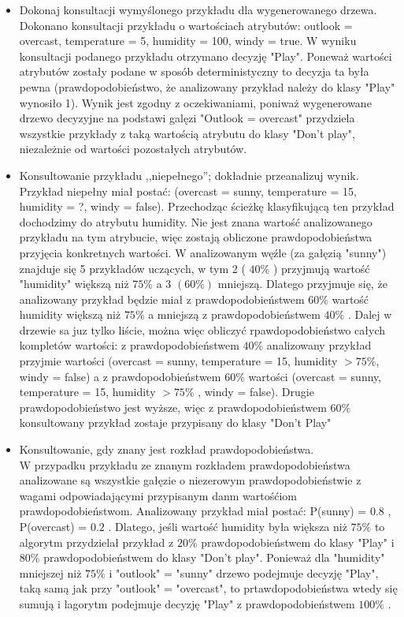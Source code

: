 \begin{itemize}
\item Dokonaj konsultacji wymyślonego przykładu dla wygenerowanego drzewa.
	\\Dokonano konsultacji przykładu o wartościach atrybutów: outlook = overcast, temperature = 5, humidity = 100, windy = true. W wyniku konsultacji podanego przykładu otrzymano decyzję "Play". Poneważ wartości atrybutów zostały podane w sposób deterministyczny to decyzja ta była pewna (prawdopodobieństwo, że analizowany przykład należy do klasy "Play" wynosiło 1). Wynik jest zgodny z oczekiwaniami, poniważ wygenerowane drzewo decyzyjne na podstawi galęzi "Outlook = overcast" przydziela wszystkie przykłady z taką wartością atrybutu do klasy "Don't play", niezależnie od wartości pozostałych atrybutów.
	
\item Konsultowanie przykładu ,,niepełnego''; dokładnie przeanalizuj wynik.
	\\Przykład niepełny miał postać: (overcast = sunny, temperature = 15, humidity = ?, windy = false). Przechodząc ścieżkę klasyfikującą ten przykład dochodzimy do atrybutu humidity. Nie jest znana wartość analizowanego przykładu na tym atrybucie, więc zostają obliczone prawdopodobieństwa przyjęcia konkretnych wartości. W analizowanym węźle (za gałęzią "sunny") znajduje się 5 przykładów uczących, w tym 2 ( $ 40\% $ ) przyjmują wartość "humidity" większą niż $ 75\% $ a 3  $ ( 60\% ) $ mniejszą. Dlatego przyjmuje się, że analizowany przykład będzie miał z prawdopodobieństwem $ 60\% $ wartość humidity większą niż $ 75\% $ a mniejszą z prawdopodobieństwem $ 40\% $ .	Dalej w drzewie sa juz tylko liście, można więc obliczyć rpawdopodobieństwo całych kompletów wartości: z prawdopodobieństwem $ 40\% $ analizowany przykład przyjmie wartości (overcast = sunny, temperature = 15, humidity  $ > 75\% $, windy = false) a z prawdopodobieństwem $ 60\% $ wartości  (overcast = sunny, temperature = 15, humidity $ >  75\% $ , windy = false). Drugie prawdopodobieństwo jest wyższe, więc z prawdopodobieństwem $ 60\% $ konsultowany przykład zostaje przypisany do klasy "Don't Play"
	
\item Konsultowanie, gdy znany jest rozkład prawdopodobieństwa.
	\\W przypadku przykładu ze znanym rozkładem prawdopodobieństwa analizowane są wszystkie gałęzie o niezerowym prawdopodobieństwie z wagami odpowiadającymi przypisanym danm wartośćiom prawdopodobieństwom. Analizowany przykład miał postać: P(sunny) = $ 0.8 $ , P(overcast) = $ 0.2 $ . Dlatego, jeśli wartość humidity była większa niż $ 75\% $ to algorytm przydzielał przykład z $ 20\% $ prawdopodobieństwem do klasy "Play" i $ 80 \% $ prawdopodobieństwem do klasy "Don't play". Ponieważ dla "humidity" mniejszej niż $ 75\% $ i "outlook" = "sunny" drzewo podejmuje decyzję "Play", taką samą jak przy "outlook" = "overcast", to prtawdopodobieństwa wtedy się sumują i lagorytm podejmuje decyzję "Play" z prawdopodobieństwem $ 100 \% $ .

\end{itemize}

